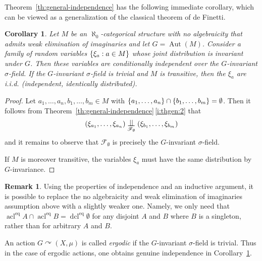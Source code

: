 \documentclass[JEP,XML,SOM,Unicode,published]{cedram}
\let\mathcal\mathscr
\let\actson\curvearrowright
\theoremstyle{plain}
\newtheorem{cor}[theorem]{Corollary}
\theoremstyle{definition}
\newtheorem{remark}[theorem]{Remark}
\newcommand{\cF}{\mathcal{F}}
\DeclareMathOperator{\acl}{acl}
\DeclareMathOperator{\Aut}{Aut}
\DeclareMathOperator{\dcl}{dcl}
\DeclarePairedDelimiter\set{\{}{\}}
\newcommand{\eq}{^{\mathrm{eq}}}
\newcommand{\indep}[1][]{%
  \mathrel{
    \mathop{
      \scalebox{1}[1.3]{\text{$\perp\!\!\!\perp$}}
    }\displaylimits_{#1}
  }
}
\begin{document}
Theorem~\ref{th:general-independence} has the following immediate corollary, which can be viewed as a generalization of the classical theorem of de Finetti.
\begin{cor}
\label{c:deFinetti}
Let $M$ be an $\aleph_0$-categorical structure with no algebraicity that admits weak elimination of imaginaries and let $G = \Aut(M)$. Consider a family of random variables $\set{\xi_a : a \in M}$ whose joint distribution is invariant under $G$. Then these variables are conditionally independent over the $G$-invariant $\sigma$-field. If the $G$\nobreakdash-invariant $\sigma$-field is trivial and $M$ is transitive, then the $\xi_a$ are \emph{i.i.d.} (independent, identically distributed).
\end{cor}
\begin{proof}
Let $a_1, \ldots, a_n, b_1, \ldots, b_m \in M$ with $\set{a_1, \ldots, a_n} \cap \set{b_1, \ldots, b_m} = \emptyset$. Then it follows from Theorem~\ref{th:general-independence}\,\eqref{i:thgen:2} that
\begin{equation*}
(\xi_{a_1},\ldots, \xi_{a_n}) \indep[\mathcal{F}_\emptyset] (\xi_{b_1},\ldots, \xi_{b_m})
\end{equation*}
and it remains to observe that $\cF_\emptyset$ is precisely the $G$-invariant $\sigma$-field.

If $M$ is moreover transitive, the variables $\xi_a$ must have the same distribution by $G$-invariance.
\end{proof}

\begin{remark}
\label{rem:dF-weaker-assumption}
Using the properties of independence and an inductive argument, it is possible to replace the no algebraicity and weak elimination of imaginaries assumption above with a slightly weaker one. Namely, we only need that $\acl\eq A \cap \acl\eq B = \dcl\eq \emptyset$ for any disjoint $A$ and $B$ where $B$ is a singleton, rather than for arbitrary $A$ and $B$.
\end{remark}

An action $G \actson (X, \mu)$ is called \emph{ergodic} if the $G$-invariant $\sigma$-field is trivial. Thus in the case of ergodic actions, one obtains genuine independence in Corollary~\ref{c:deFinetti}.
\end{document}
